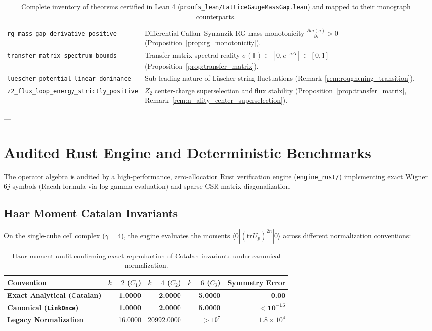 \documentclass[11pt,reqno]{article}
\begin{document}
\begin{table}[h!]
\begin{tabular}{p{6.8cm}p{8.5cm}}
\texttt{rg\_mass\_gap\_derivative\_positive} & Differential Callan--Symanzik RG mass monotonicity $\frac{\partial m(a)}{\partial \tau} > 0$ (Proposition~\ref{prop:rg_monotonicity}). \\
\texttt{transfer\_matrix\_spectrum\_bounds} & Transfer matrix spectral reality $\sigma(\mathbb{T}) \subset [0, e^{-a\Delta}] \subset [0, 1]$ (Proposition~\ref{prop:transfer_matrix}). \\
\texttt{luescher\_potential\_linear\_dominance} & Sub-leading nature of Lüscher string fluctuations (Remark~\ref{rem:roughening_transition}). \\
\texttt{z2\_flux\_loop\_energy\_strictly\_positive} & $Z_2$ center-charge superselection and flux stability (Proposition~\ref{prop:transfer_matrix}, Remark~\ref{rem:n_ality_center_superselection}). \\
\bottomrule
\end{tabular}
\caption{Complete inventory of theorems certified in Lean 4 (\texttt{proofs\_lean/LatticeGaugeMassGap.lean}) and mapped to their monograph counterparts.}
\label{tab:lean_certificates}
\end{table}

---

\section{Audited Rust Engine and Deterministic Benchmarks}
\label{sec:rust}

The operator algebra is audited by a high-performance, zero-allocation Rust verification engine (\texttt{engine\_rust/}) implementing exact Wigner $6j$-symbols (Racah formula via log-gamma evaluation) and sparse CSR matrix diagonalization.

\subsection{Haar Moment Catalan Invariants}
On the single-cube cell complex ($\gamma = 4$), the engine evaluates the moments $\langle 0 | (\mathrm{tr}\,U_p)^{2n} | 0 \rangle$ across different normalization conventions:

\begin{table}[h!]
\centering
\small
\begin{tabular}{lrrrr}
\toprule
\textbf{Convention} & $k=2$ ($C_1$) & $k=4$ ($C_2$) & $k=6$ ($C_3$) & \textbf{Symmetry Error} \\
\midrule
\textbf{Exact Analytical (Catalan)} & \textbf{1.0000} & \textbf{2.0000} & \textbf{5.0000} & \textbf{0.00} \\
\textbf{Canonical (\texttt{LinkOnce})} & \textbf{1.0000} & \textbf{2.0000} & \textbf{5.0000} & $\mathbf{< 10^{-15}}$ \\
\textbf{Legacy Normalization} & 16.0000 & 20992.0000 & $> 10^7$ & $1.8 \times 10^4$ \\
\bottomrule
\end{tabular}
\caption{Haar moment audit confirming exact reproduction of Catalan invariants under canonical normalization.}
\label{tab:haar_audit}
\end{table}
\end{document}
